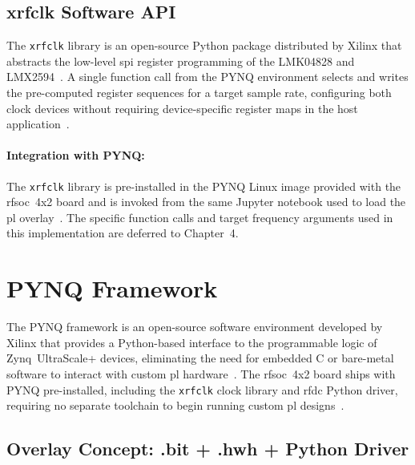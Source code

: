 \subsection{xrfclk Software API}
\label{subsec:xrfclk_background}

The \texttt{xrfclk} library is an open-source Python package
distributed by Xilinx that abstracts the low-level \ac{spi}
register programming of the LMK04828 and LMX2594~\cite{xrfclk}.
A single function call from the PYNQ environment selects and writes
the pre-computed register sequences for a target sample rate,
configuring both clock devices without requiring device-specific
register maps in the host application~\cite{xrfclk}.

\paragraph{Integration with PYNQ:}
The \texttt{xrfclk} library is pre-installed in the PYNQ Linux image
provided with the \ac{rfsoc}~4x2 board and is invoked from the same
Jupyter notebook used to load the \ac{pl} overlay~\cite{RealDigital_A6,PYNQ_DOC}.
The specific function calls and target frequency arguments used in
this implementation are deferred to Chapter~4.

\clearpage


\section{PYNQ Framework}
\label{sec:pynq_background}

The PYNQ framework is an open-source software environment developed
by Xilinx that provides a Python-based interface to the programmable
logic of Zynq~UltraScale+ devices, eliminating the need for embedded
C or bare-metal software to interact with custom \ac{pl}
hardware~\cite{PYNQ_DOC}.
The \ac{rfsoc}~4x2 board ships with PYNQ pre-installed, including the
\texttt{xrfclk} clock library and \ac{rfdc} Python driver, requiring
no separate toolchain to begin running custom \ac{pl}
designs~\cite{RealDigital_A6,PYNQ_DOC}.


\subsection{Overlay Concept: .bit + .hwh + Python Driver}
\label{subsec:pynq_overlay}

